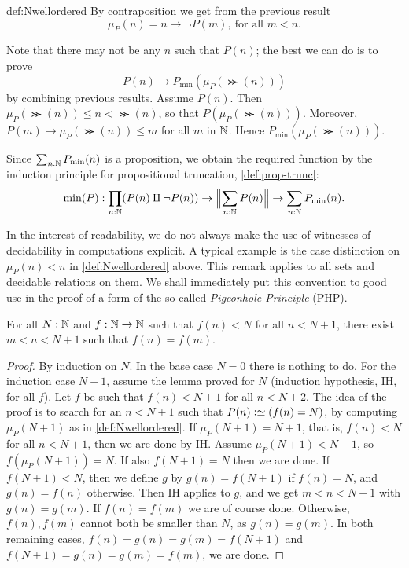 \begin{implementation}{def:Nwellordered}
By contraposition we get from the previous result
\[
\mu_P(n)= n \to \neg P(m),~\text{for all $m<n$.}
\]

Note that there may not be any $n$ such that $P(n)$;
the best we can do is to prove
\[
P(n)\to P_{\min}(\mu_P(\Succ(n)))
\]
by combining previous results. Assume $P(n)$.
Then $\mu_P(\Succ(n))\leq n < \Succ(n)$, so that $P(\mu_P(\Succ(n)))$.
Moreover, $P(m) \to \mu_P(\Succ(n))\leq m$ for all $m$ in $\NN$.
Hence $P_{\min}(\mu_P(\Succ(n)))$.

Since $\sum_{n:\NN} P_{\min}(n)$ is a proposition, 
we obtain the required function by the induction
principle for propositional truncation, \cref{def:prop-trunc}:
\[
\min(P) : \prod_{n:\NN}(P(n)\amalg\neg P(n)) \to 
           \Trunc[\Big]{\sum_{n:\NN} P(n)} \to  \sum_{n:\NN} P_{\min}(n).\qedhere
\]
\end{implementation}

\begin{remark}\label{rem:computations-can-decide}
In the interest of readability, we do not always make the use
of witnesses of decidability in computations explicit.
A typical example is the case distinction on $\mu_P(n) < n$ in
\cref{def:Nwellordered} above. This remark applies to all
sets and decidable relations on them. We shall immediately put
this convention to good use in the proof of a form of the so-called
\emph{Pigeonhole Principle} (PHP).
\end{remark}

\begin{lemma}\label{lem:PHP}
For all $N:\NN$ and $f:\NN\to\NN$ such that $f(n)<N$
for all $n<N+1$, there exist $m < n < N+1$ such that $f(n)=f(m)$.
\end{lemma}
\begin{proof}
By induction on $N$. In the base case $N=0$ there is nothing to do.
For the induction case $N+1$, assume the lemma proved for $N$
(induction hypothesis, IH, for all $f$). Let $f$ be such 
that $f(n)<N+1$ for all $n<N+2$. The idea of the proof is
to search for an $n<N+1$ such that $P(n)\defeq (f(n)=N)$,
by computing $\mu_P(N+1)$ as in \cref{def:Nwellordered}.
If $\mu_P(N+1)=N+1$, that is, $f(n)<N$ for all $n<N+1$,
then we are done by IH. Assume $\mu_P(N+1) < N+1$,
so $f(\mu_P(N+1))=N$.
If also $f(N+1)=N$ then we are done.
If $f(N+1)<N$, then we define $g$ by $g(n)=f(N+1)$
if $f(n)= N$, and $g(n)=f(n)$ otherwise. 
Then IH applies to $g$, and we get $m < n < N+1$ with 
$g(n)=g(m)$. If $f(n)=f(m)$ we are of course done. 
Otherwise, $f(n),f(m)$ cannot both be smaller than $N$, 
as $g(n)=g(m)$. In both remaining cases, 
$f(n)=g(n)=g(m)=f(N+1)$ and $f(N+1)=g(n)=g(m)=f(m)$,
we are done.
\end{proof}

